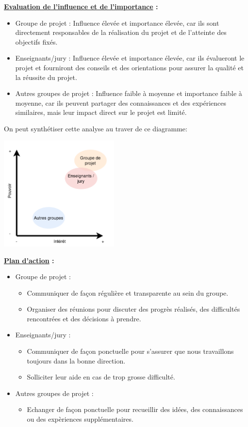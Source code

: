 \documentclass[a4paper, 12pt]{report}
\begin{document}
\textbf{\underline{Evaluation de l'influence et de l'importance} :}
\begin{itemize}
    \item Groupe de projet : Influence élevée et importance élevée, car ils sont directement responsables de la réalisation du projet et de l'atteinte des objectifs fixés.
    \item Enseignants/jury : Influence élevée et importance élevée, car ils évalueront le projet et fourniront des conseils et des orientations pour assurer la qualité et la réussite du projet.
    \item Autres groupes de projet : Influence faible à moyenne et importance faible à moyenne, car ils peuvent partager des connaissances et des expériences similaires, mais leur impact direct sur le projet est limité.
\end{itemize}
\bigskip

On peut synthétiser cette analyse au traver de ce diagramme:

\begin{center}
    \includegraphics[width = 0.45\textwidth]{IMG/parties_prenantes.png}
\end{center}

\textbf{\underline{Plan d'action} :}
\begin{itemize}
    \item Groupe de projet :
          \begin{itemize}
              \item Communiquer de façon régulière et transparente au sein du groupe.
              \item Organiser des réunions pour discuter des progrès réalisés, des difficultés rencontrées et des décisions à prendre.
          \end{itemize}
    \item Enseignants/jury :
          \begin{itemize}
              \item Communiquer de façon ponctuelle pour s'assurer que nous travaillons toujours dans la bonne direction.
              \item Solliciter leur aide en cas de trop grosse difficulté.
          \end{itemize}
    \item Autres groupes de projet :
          \begin{itemize}
              \item Echanger de façon ponctuelle pour recueillir des idées, des connaissances ou des expèriences supplémentaires.
          \end{itemize}
\end{itemize}
\end{document}
